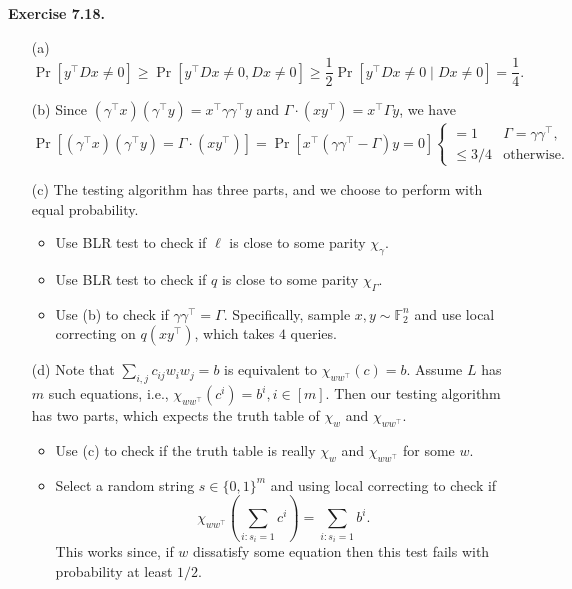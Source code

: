 \documentclass[a4paper]{article}
\newenvironment{exercise}[1]{
	\par
	\noindent\textbf{Exercise #1.}\quad
}{
	\par
	\bigskip
}
\newcommand{\pbra}[1]{{\left( #1 \right)}}
\newcommand{\sbra}[1]{{\left[ #1 \right]}}
\newcommand{\bin}{{\{0,1\}}}
\newcommand{\Fbb}{\mathbb{F}}
\begin{document}
\begin{exercise}{7.18}
    \begin{itemize}
        \item[(a)] 
            $$
            \Pr\sbra{y^\top Dx\neq0}\geq\Pr\sbra{y^\top Dx\neq0,Dx\neq0}\geq\frac12\Pr\sbra{y^\top Dx\neq0\mid Dx\neq0}=\frac14.
            $$
        \item[(b)] Since $(\gamma^\top x)(\gamma^\top y)=x^\top\gamma\gamma^\top y$ and $\Gamma\cdot(xy^\top)=x^\top\Gamma y$,
            we have
            $$
            \Pr\sbra{(\gamma^\top x)(\gamma^\top y)=\Gamma\cdot(xy^\top)}=\Pr\sbra{x^\top(\gamma\gamma^\top-\Gamma)y=0}
            \begin{cases}
                =1&\Gamma=\gamma\gamma^\top,\\
                \leq3/4&\text{otherwise}.
            \end{cases}
            $$
        \item[(c)] The testing algorithm has three parts, and we choose to perform with equal probability.
            \begin{itemize}
                \item Use BLR test to check if $\ell$ is close to some parity $\chi_\gamma$.
                \item Use BLR test to check if $q$ is close to some parity $\chi_\Gamma$.
                \item Use (b) to check if $\gamma\gamma^\top=\Gamma$. Specifically, sample $x,y\sim\Fbb_2^n$ and 
                    use local correcting on $q(xy^\top)$, which takes $4$ queries.
            \end{itemize}
        \item[(d)] Note that $\sum_{i,j}c_{ij}w_iw_j=b$ is equivalent to $\chi_{ww^\top}(c)=b$.
            Assume $L$ has $m$ such equations, i.e., $\chi_{ww^\top}(c^i)=b^i,i\in[m]$. Then our testing algorithm has two parts,
            which expects the truth table of $\chi_w$ and $\chi_{ww^\top}$.
            \begin{itemize}
                \item Use (c) to check if the truth table is really $\chi_w$ and $\chi_{ww^\top}$ for some $w$.
                \item Select a random string $s\in\bin^m$ and using local correcting to check if 
                    $$
                    \chi_{ww^\top}\pbra{\sum_{i:s_i=1}c^i}=\sum_{i:s_i=1}b^i.
                    $$
                    This works since, if $w$ dissatisfy some equation then this test fails with probability at least $1/2$.

\end{itemize}
\end{itemize}
\end{exercise}
\end{document}
